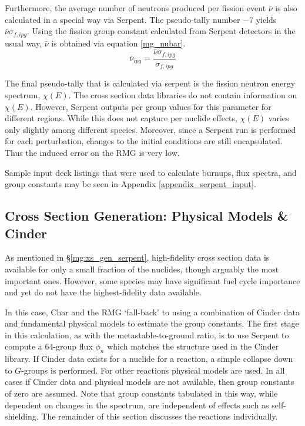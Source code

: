 Furthermore, the average number of neutrons produced per fission event $\bar{\nu}$ is also 
calculated in a special way via Serpent.  The pseudo-tally number $-7$ yields $\bar{\nu}\sigma_{f,ipg}$.
Using the fission group constant calculated from Serpent detectors in the usual way, $\bar{\nu}$
is obtained via equation \ref{mg_nubar}.
\begin{equation}
\label{mg_nubar}
\bar{\nu}_{ipg} = \frac{\bar{\nu}\sigma_{f,ipg}}{\sigma_{f,ipg}}
\end{equation}

The final pseudo-tally that is calculated via serpent is the fission neutron energy spectrum, $\chi(E)$.
The cross section data libraries do not contain information on $\chi(E)$.  However, 
Serpent outputs per group values for this parameter for different regions.  While this does not 
capture per nuclide effects, $\chi(E)$ varies only slightly among different species.  
Moreover, since a Serpent run is performed for each perturbation, changes to 
the initial conditions are still encapsulated.  Thus the induced error on the RMG is very low.

Sample input deck listings that were used to calculate burnups, flux spectra, and group constants
may be seen in Appendix \ref{appendix_serpent_input}.

\subsection{Cross Section Generation: Physical Models \& Cinder}
\label{mg:xs_gen_physics}
As mentioned in \S \ref{mg:xs_gen_serpent}, high-fidelity cross section data is available for only 
a small fraction of the nuclides, though arguably the most important ones.  However, some species 
may have significant fuel cycle importance and yet do not have the highest-fidelity data available.

In this case, Char and the RMG `fall-back' to using a combination of Cinder data and fundamental 
physical models to estimate the group constants. The first stage in this calculation, as with the 
metastable-to-ground ratio, is to use Serpent to compute a 64-group flux $\phi_n$
which matches the structure used in the Cinder library.  If Cinder data exists for a nuclide for 
a reaction, a simple collapse down to $G$-groups is performed.  For other reactions physical
models are used.  In all cases if Cinder data and physical models are not available, then group
constants of zero are assumed.  Note that group constants tabulated in this way, while dependent 
on changes in the spectrum, are independent of effects such as self-shielding.
The remainder of this section discusses the reactions individually.

